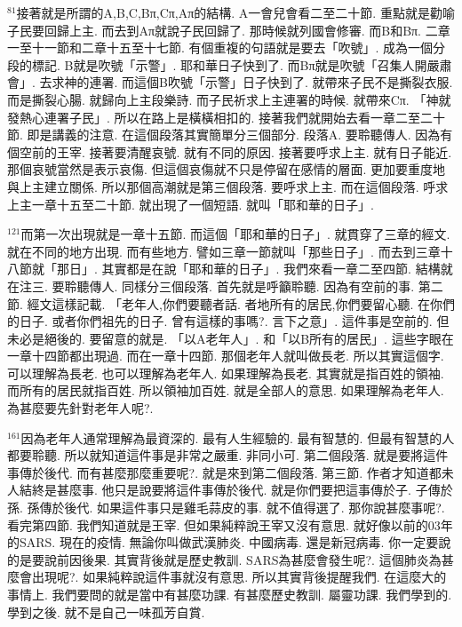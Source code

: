 \documentclass{book}
\begin{document}
$^{81}$接著就是所謂的A,B,C,Bπ,Cπ,Aπ的結構.
A一會兒會看二至二十節.
重點就是勸喻子民要回歸上主.
而去到Aπ就說子民回歸了.
那時候就列國會修審.
而B和Bπ.
二章一至十一節和二章十五至十七節.
有個重複的句語就是要去「吹號」.
成為一個分段的標記.
B就是吹號「示警」.
耶和華日子快到了.
而Bπ就是吹號「召集人開嚴肅會」.
去求神的連署.
而這個B吹號「示警」日子快到了.
就帶來子民不是撕裂衣服.
而是撕裂心腸.
就歸向上主段樂詩.
而子民祈求上主連署的時候.
就帶來Cπ.
「神就發熱心連署子民」.
所以在路上是橫橫相扣的.
接著我們就開始去看一章二至二十節.
即是講義的注意.
在這個段落其實簡單分三個部分.
段落A.
要聆聽傳人.
因為有個空前的王宰.
接著要清醒哀號.
就有不同的原因.
接著要呼求上主.
就有日子能近.
那個哀號當然是表示哀傷.
但這個哀傷就不只是停留在感情的層面.
更加要重度地與上主建立關係.
所以那個高潮就是第三個段落.
要呼求上主.
而在這個段落.
呼求上主一章十五至二十節.
就出現了一個短語.
就叫「耶和華的日子」.

$^{121}$而第一次出現就是一章十五節.
而這個「耶和華的日子」.
就貫穿了三章的經文.
就在不同的地方出現.
而有些地方.
譬如三章一節就叫「那些日子」.
而去到三章十八節就「那日」.
其實都是在說「耶和華的日子」.
我們來看一章二至四節.
結構就在注三.
要聆聽傳人.
同樣分三個段落.
首先就是呼籲聆聽.
因為有空前的事.
第二節.
經文這樣記載.
「老年人,你們要聽者話.
者地所有的居民,你們要留心聽.
在你們的日子.
或者你們祖先的日子.
曾有這樣的事嗎?.
言下之意」.
這件事是空前的.
但未必是絕後的.
要留意的就是.
「以A老年人」.
和「以B所有的居民」.
這些字眼在一章十四節都出現過.
而在一章十四節.
那個老年人就叫做長老.
所以其實這個字.
可以理解為長老.
也可以理解為老年人.
如果理解為長老.
其實就是指百姓的領袖.
而所有的居民就指百姓.
所以領袖加百姓.
就是全部人的意思.
如果理解為老年人.
為甚麼要先針對老年人呢?.

$^{161}$因為老年人通常理解為最資深的.
最有人生經驗的.
最有智慧的.
但最有智慧的人都要聆聽.
所以就知道這件事是非常之嚴重.
非同小可.
第二個段落.
就是要將這件事傳於後代.
而有甚麼那麼重要呢?.
就是來到第二個段落.
第三節.
作者才知道都未人結終是甚麼事.
他只是說要將這件事傳於後代.
就是你們要把這事傳於子.
子傳於孫.
孫傳於後代.
如果這件事只是雞毛蒜皮的事.
就不值得選了.
那你說甚麼事呢?.
看完第四節.
我們知道就是王宰.
但如果純粹說王宰又沒有意思.
就好像以前的03年的SARS.
現在的疫情.
無論你叫做武漢肺炎.
中國病毒.
還是新冠病毒.
你一定要說的是要說前因後果.
其實背後就是歷史教訓.
SARS為甚麼會發生呢?.
這個肺炎為甚麼會出現呢?.
如果純粹說這件事就沒有意思.
所以其實背後提醒我們.
在這麼大的事情上.
我們要問的就是當中有甚麼功課.
有甚麼歷史教訓.
屬靈功課.
我們學到的.
學到之後.
就不是自己一味孤芳自賞.
\end{document}
